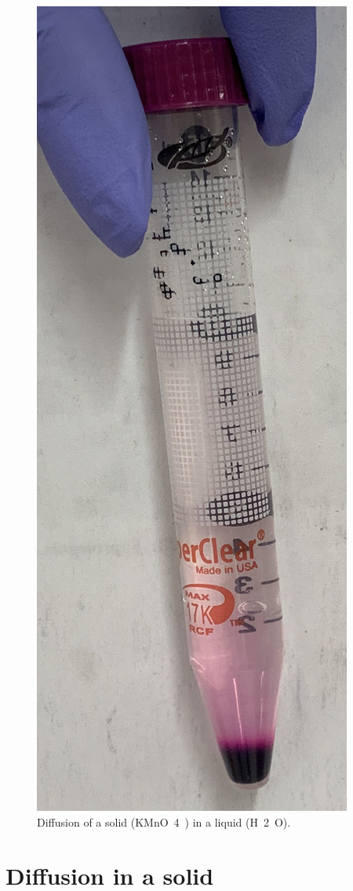 \begin{figure}

{\centering \includegraphics[width=0.7\linewidth]{./figures/exchange/liquid_diffusion} 

}

\caption{Diffusion of a solid (KMnO~4~) in a liquid (H~2~O).}\label{fig:liquid}
\end{figure}

\section{Diffusion in a solid}\label{diffusion-in-a-solid}

